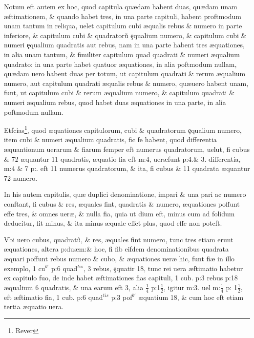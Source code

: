  Notum eft autem ex hoc, quod capitula qu{\ae}dam habent duas, qu{\ae}dam unam {\ae}ftimationem, \& quando habet tres, in una parte capituli, habent proftmodum unam tantum in reliqua, uelet capitulum cubi {\ae}qualis rebus \& numero in parte inferiore, \& capitulum cubi \& quadrator\~{u} \c{e}qualium numero, \& capitulum cubi \& numeri \c{e}qualium quadratis aut rebus, nam in una parte habent tres {\ae}quationes, in alia unam tantum, \& fimiliter capitulum quad quadrati \& numeri {\ae}qualium quadrato: in una parte habet quatuor {\ae}quationes, in alia poftmodum nullam, qu{\ae}dam uero habent duas per totum, ut capitulum quadrati \& rerum {\ae}qualium numero, aut capitulum quadrati {\ae}qualis rebus \& numero, qu\ae uero habent unam, funt, ut capitulum cubi \& rerum {\ae}qualium numero, \& capitulum quadrati \& numeri {\ae}qualium rebus, quod habet duas {\ae}quationes in una parte, in alia poftmodum nullam.

 Etfcias\footnote{Rever}, quod {\ae}quationes capitulorum, cubi \& quadratorum \c{e}qualium numero, item cubi \& numeri {\ae}qualium quadratis, fic fe habent, quod differentia {\ae}quantionum uerarum \& fi{\ct}arum femper eft numerus quadratorum, uelut, fi cubus \& 72 {\ae}quantur 11 quadratis, {\ae}quatio fi{\ct}a eft  m:4, uer\ae funt  p:4.\& 3. differentia,  m:4 \& 7 p:. eft 11 numerus quadratorum, \& ita, fi cubus \& 11 quadrata {\ae}quantur 72 numero.

 In his autem capitulis, qu{\ae} duplici denominatione, impari \& una pari ac numero conftant, fi cubus \& res, {\ae}quales fint, quadratis \& numero, {\ae}quationes poffunt effe tres, \& omnes uer{\ae}, \& nulla fi{\ct}a, quia ut di{\ct}um eft, minus cum ad folidum deducitur, fit minus, \& ita minus {\ae}quale effet plus, quod effe non poteft.

Vbi uero cubus, quadrat\~{u}, \& res, {\ae}quales fint numero, tunc tres etiam erunt {\ae}quationes, altera p:du\ae m:\& hoc, fi fib eifdem denominationibus quadrata {\ae}quari poffunt rebus numero \& cubo, \& {\ae}quationes uer{\ae} hic, funt fi{\ct\ae} in illo exemplo, 1 cu\(^{b'}\) p:6 quad\(^{tis}\), 3 rebus, \c{e}quatir 18, tunc rei uera {\ae}ftimatio habetur ex capitulo fuo, de inde habet {\ae}ftimationes fi{\ct}as capituli, 1 cub. p:3 rebus p:18 {\ae}qualium 6 quadratis, \& una earum eft 3, alia \( \tfrac{1}{4} \) p:1\( \tfrac{1}{2} \), igitur m:3. uel m:\( \tfrac{1}{4} \) p: 1\( \tfrac{1}{2} \), eft {\ae}ftimatio fi{\ct}a, 1 cub. p:6 quad\(^{tis}\) p:3 pof\(^{b'}\) {\ae}quatium 18, \& cum hoc eft etiam tertia {\ae}quatio uera.

